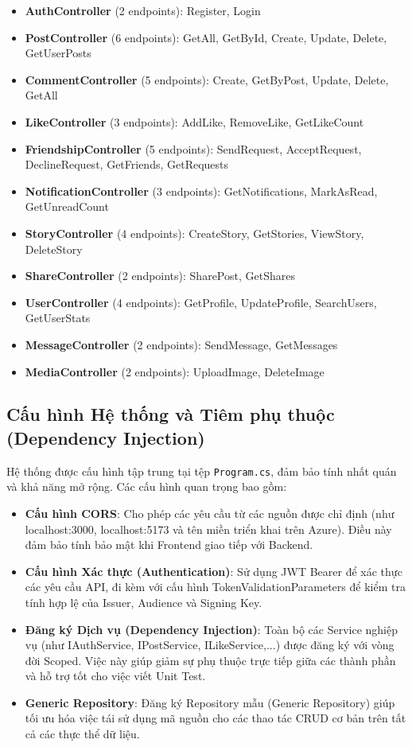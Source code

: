 \documentclass[a4paper]{article}
\begin{document}
    \begin{itemize}
        \item \textbf{AuthController} (2 endpoints): Register, Login
        \item \textbf{PostController} (6 endpoints): GetAll, GetById, Create, Update, Delete, GetUserPosts
        \item \textbf{CommentController} (5 endpoints): Create, GetByPost, Update, Delete, GetAll
        \item \textbf{LikeController} (3 endpoints): AddLike, RemoveLike, GetLikeCount
        \item \textbf{FriendshipController} (5 endpoints): SendRequest, AcceptRequest, DeclineRequest, GetFriends, GetRequests
        \item \textbf{NotificationController} (3 endpoints): GetNotifications, MarkAsRead, GetUnreadCount
        \item \textbf{StoryController} (4 endpoints): CreateStory, GetStories, ViewStory, DeleteStory
        \item \textbf{ShareController} (2 endpoints): SharePost, GetShares
        \item \textbf{UserController} (4 endpoints): GetProfile, UpdateProfile, SearchUsers, GetUserStats
        \item \textbf{MessageController} (2 endpoints): SendMessage, GetMessages
        \item \textbf{MediaController} (2 endpoints): UploadImage, DeleteImage
    \end{itemize}
    \subsection{Cấu hình Hệ thống và Tiêm phụ thuộc (Dependency Injection)}
    Hệ thống được cấu hình tập trung tại tệp \texttt{Program.cs}, đảm bảo tính nhất quán và khả năng mở rộng. Các cấu hình quan trọng bao gồm:
    \begin{itemize}
        \item \textbf{Cấu hình CORS}: Cho phép các yêu cầu từ các nguồn được chỉ định (như localhost:3000, localhost:5173 và tên miền triển khai trên Azure). Điều này đảm bảo tính bảo mật khi Frontend giao tiếp với Backend.
        \item \textbf{Cấu hình Xác thực (Authentication)}: Sử dụng JWT Bearer để xác thực các yêu cầu API, đi kèm với cấu hình TokenValidationParameters để kiểm tra tính hợp lệ của Issuer, Audience và Signing Key.
        \item \textbf{Đăng ký Dịch vụ (Dependency Injection)}: Toàn bộ các Service nghiệp vụ (như IAuthService, IPostService, ILikeService,...) được đăng ký với vòng đời Scoped. Việc này giúp giảm sự phụ thuộc trực tiếp giữa các thành phần và hỗ trợ tốt cho việc viết Unit Test.
        \item \textbf{Generic Repository}: Đăng ký Repository mẫu (Generic Repository) giúp tối ưu hóa việc tái sử dụng mã nguồn cho các thao tác CRUD cơ bản trên tất cả các thực thể dữ liệu.
    \end{itemize}
\end{document}
